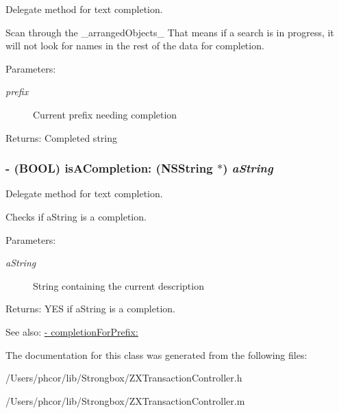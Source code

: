 Delegate method for text completion. 

Scan through the \_\-arrangedObjects\_\- That means if a search is in progress, it will not look for names in the rest of the data for completion. \begin{Desc}
\item[Parameters:]
\begin{description}
\item[{\em prefix}]Current prefix needing completion \end{description}
\end{Desc}
\begin{Desc}
\item[Returns:]Completed string \end{Desc}
\hypertarget{interface_z_x_transaction_controller_4cdf7af804db8c1382af072cf497113e}{
\subsubsection[{isACompletion:}]{\setlength{\rightskip}{0pt plus 5cm}- (BOOL) isACompletion: (NSString $\ast$) {\em aString}}}
\label{interface_z_x_transaction_controller_4cdf7af804db8c1382af072cf497113e}


Delegate method for text completion. 

Checks if aString is a completion. \begin{Desc}
\item[Parameters:]
\begin{description}
\item[{\em aString}]String containing the current description \end{description}
\end{Desc}
\begin{Desc}
\item[Returns:]YES if aString is a completion. \end{Desc}
\begin{Desc}
\item[See also:]\hyperlink{interface_z_x_transaction_controller_29315035e584855a5723447f23992560}{- completionForPrefix:} \end{Desc}


The documentation for this class was generated from the following files:\begin{CompactItemize}
\item 
/Users/phcor/lib/Strongbox/ZXTransactionController.h\item 
/Users/phcor/lib/Strongbox/ZXTransactionController.m\end{CompactItemize}
